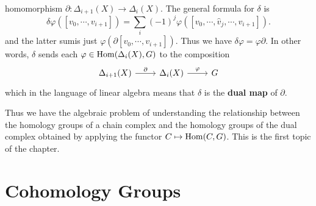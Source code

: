 homomorphism $\partial:\Delta_{i+1}(X)\to\Delta_i(X)$. The general formula for $\delta$ is
\[\delta\varphi([v_0,\cdots,v_{i+1}])=\sum_{i}(-1)^j\varphi([v_0,\cdots,\widehat{v}_j,\cdots,v_{i+1}]).\]
and the latter sumis just $\varphi(\partial[v_0,\cdots,v_{i+1}])$. Thus we have $\delta\varphi=\varphi\partial$. In other words, $\delta$ sends each $\varphi\in\mathrm{Hom}(\Delta_i(X),G)$ to the composition 
\[\begin{tikzcd}
\Delta_{i+1}(X)\ar[r,"\partial"]&\Delta_i(X)\ar[r,"\varphi"]&G
\end{tikzcd}\]
which in the language of linear algebra means that $\delta$ is the \textbf{dual map} of $\partial$.\par
Thus we have the algebraic problem of understanding the relationship between
the homology groups of a chain complex and the homology groups of the dual complex obtained by applying the functor $C\mapsto\mathrm{Hom}(C,G)$. This is the first topic of the chapter.
\section{Cohomology Groups}
